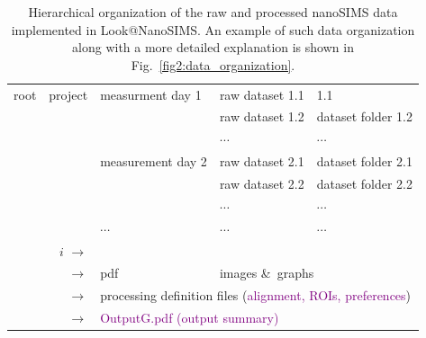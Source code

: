 \documentclass[a4paper, 11pt]{article}
\begin{document}
\begin{table}[ht]
\centering
\caption{\label{tab1:file_structure} Hierarchical organization of the raw and processed nanoSIMS data implemented in Look@NanoSIMS. An example of such data organization along with a more detailed explanation is shown in Fig.~\ref{fig2:data_organization}.}
\begin{tabular}{l@{ $\rightarrow$ }c@{ $\rightarrow$ }l@{ $\rightarrow$ }l@{ $\rightarrow$ }l}
\hline
root & project & measurment day 1 & raw dataset 1.1 & \color{red}{dataset folder} 1.1\\
\multicolumn{2}{c}{} & & raw dataset 1.2  & dataset folder 1.2\\
\multicolumn{2}{c}{} & & $\cdots$ & $\cdots$ \\
\multicolumn{1}{c}{} & & measurement day 2 & raw dataset 2.1  & dataset folder 2.1\\
\multicolumn{2}{c}{} & & raw dataset 2.2  & dataset folder 2.2\\
\multicolumn{2}{c}{} & & $\cdots$ & $\cdots$\\
\multicolumn{1}{c}{} & & $\cdots$ & $\cdots$ & $\cdots$\\
\hline
\multicolumn{2}{r}{\color{red}{dataset folder} $i$ $\rightarrow$} & \color{orange}{dat} & \multicolumn{2}{l}{\color{orange}{numbers}} \\
\multicolumn{2}{r}{$\rightarrow$} & \textcolor{darkgold}{pdf} & \multicolumn{2}{l}{\textcolor{darkgold}{images \&\ graphs}} \\
\multicolumn{2}{r}{$\rightarrow$} & \multicolumn{3}{l}{\hspace{-2mm}processing definition files (\textcolor{purple}{alignment, ROIs, preferences})} \\
\multicolumn{2}{r}{$\rightarrow$} & \multicolumn{3}{l}{\hspace{-2mm}\textcolor{purple}{OutputG.pdf (output summary)}}\\
\hline
\end{tabular}
\end{table}
\end{document}
